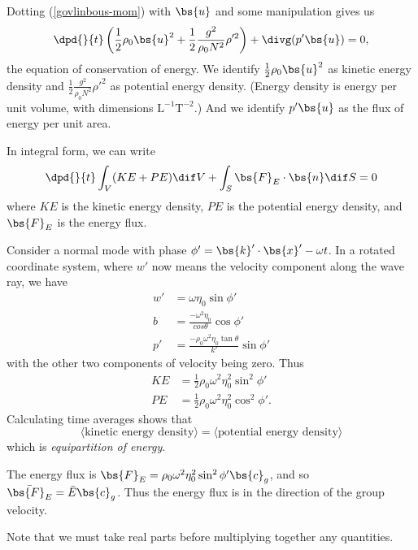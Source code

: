 Dotting (\ref{govlinbous-mom}) with $\bs{u}$ and some manipulation gives us
\begin{equation}
	\dpd{}{t}\left(\frac{1}{2}\rho_0 \bs{u}^2 + \frac{1}{2}\frac{g^2}{\rho_0N^2}\rho'^2\right) + \divg(p'\bs{u}) = 0,
\end{equation}
the equation of conservation of energy. We identify $ \frac{1}{2}\rho_0 \bs{u}^2
$ as kinetic energy density and $\frac{1}{2}\frac{g^2}{\rho_0N^2}\rho'^2$ as
potential energy density. (Energy density is energy per unit volume, with
dimensions $\mathrm{L}^{-1} \mathrm{T}^{-2}$.) And we identify $p'\bs{u}$ as the
flux of energy per unit area.

In integral form, we can write
\begin{equation}
    \dpd{}{t} \int_V (KE + PE) \dif V + \int_S \bs{F}_E \cdot \bs{n} \dif S = 0
\end{equation}
where $KE$ is the kinetic energy density, $PE$ is the potential energy density,
and $\bs{F}_E$ is the energy flux.

Consider a normal mode with phase $\phi' = \bs{k}'\cdot\bs{x}' - \omega t$. In a
rotated coordinate system, where $w'$ now means the velocity component along the
wave ray, we have 
\begin{align}
    w' &= \omega \eta_0 \sin\phi' \\
    b &= \frac{-\omega^2 \eta_0}{cos\theta} \cos\phi' \\
    p' &= \frac{-\rho_0 \omega^2 \eta_0 \tan\theta}{k'} \sin\phi'
\end{align}
with the other two components of velocity being zero. Thus
\begin{align}
    KE &= \frac{1}{2}\rho_0 \omega^2 \eta_0^2 \sin^2\phi' \\
    PE &= \frac{1}{2}\rho_0 \omega^2 \eta_0^2 \cos^2\phi'.
\end{align}
Calculating time averages shows that
\begin{equation}
\langle\text{kinetic energy density}\rangle = \langle\text{potential energy density}\rangle
\end{equation}
which is \textit{equipartition of energy}.

The energy flux is $\bs{F}_E = \rho_0 \omega^2 \eta_0^2 \sin^2\phi' \bs{c}_g$,
and so $\bar{\bs{F}_E} = \bar{E} \bs{c}_g$. Thus the energy flux is in the
direction of the group velocity. 


Note that we must take real parts before multiplying together any quantities. 

